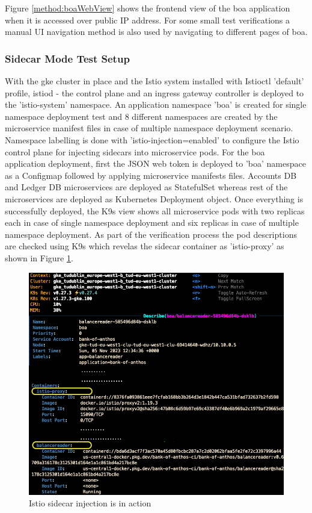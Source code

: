 Figure \ref{method:boaWebView} shows the frontend view of the \acrshort{boa} application when it is accessed over public IP address. For some small test verifications a manual UI navigation method is also used by navigating to different pages of \acrshort{boa}.


\subsubsection{Sidecar Mode Test Setup}
With the \acrshort{gke} cluster in place and the Istio system installed with Istioctl 'default' profile, istiod - the control plane and an ingress gateway controller is deployed to the 'istio-system' namespace. An application namespace 'boa' is created for single namespace deployment test and 8 different namespaces are created by the microservice manifest files in case of multiple namespace deployment scenario. Namespace labelling is done with 'istio-injection=enabled' to configure the Istio control plane for injecting sidecars into microservice pods. For the \acrshort{boa} application deployment, first the JSON web token is deployed to 'boa' namespace as a Configmap followed by applying microservice manifests files. Accounts DB and Ledger DB microservices are deployed as StatefulSet whereas rest of the microservices are deployed as Kubernetes Deployment object. Once everything is successfully deployed, the K9s view shows all microservice pods with two replicas each in case of single namespace deployment and six replicas in case of multiple namespace deployment. As part of the verification process the pod descriptions are checked using K9s which revelas the sidecar container as 'istio-proxy' as shown in Figure \ref{method:istioSidecarInjectionView}.

\begin{figure}[ht!]
    \centering
    \includegraphics[width=1.0\linewidth]{resources/istio-sidecar-injection.png}
    \caption{Istio sidecar injection is in action}
    \label{method:istioSidecarInjectionView}
\end{figure}

